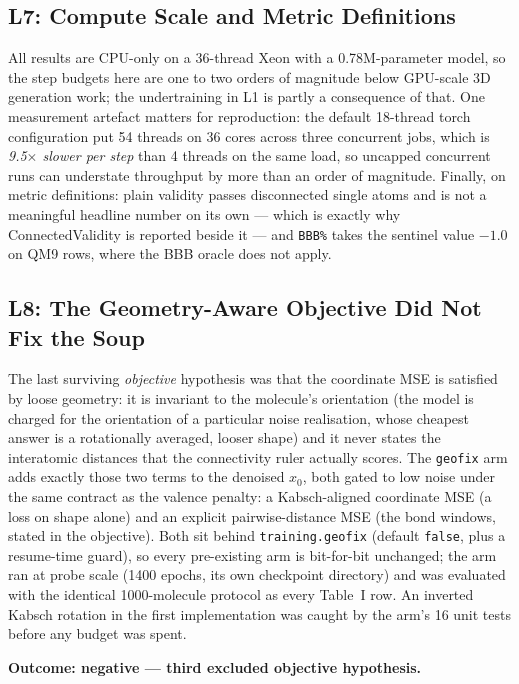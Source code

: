 \documentclass[12pt, a4paper]{article}
\begin{document}
\subsection{L7: Compute Scale and Metric Definitions}

All results are CPU-only on a 36-thread Xeon with a 0.78M-parameter model, so
the step budgets here are one to two orders of magnitude below GPU-scale 3D
generation work; the undertraining in L1 is partly a consequence of that. One
measurement artefact matters for reproduction: the default 18-thread torch
configuration put 54 threads on 36 cores across three concurrent jobs, which is
\emph{9.5$\times$ slower per step} than 4 threads on the same load, so uncapped
concurrent runs can understate throughput by more than an order of magnitude.
Finally, on metric definitions: plain validity passes disconnected single
atoms and is not a meaningful headline number on its own --- which is exactly
why ConnectedValidity is reported beside it --- and \texttt{BBB\%} takes the
sentinel value $-1.0$ on QM9 rows, where the BBB oracle does not apply.

\subsection{L8: The Geometry-Aware Objective Did Not Fix the Soup}

The last surviving \emph{objective} hypothesis was that the coordinate MSE is
satisfied by loose geometry: it is invariant to the molecule's orientation (the
model is charged for the orientation of a particular noise realisation, whose
cheapest answer is a rotationally averaged, looser shape) and it never states
the interatomic distances that the connectivity ruler actually scores. The
\texttt{geofix} arm adds exactly those two terms to the denoised $x_0$, both
gated to low noise under the same contract as the valence penalty: a
Kabsch-aligned coordinate MSE (a loss on shape alone) and an explicit
pairwise-distance MSE (the bond windows, stated in the objective). Both sit
behind \texttt{training.geofix} (default \texttt{false}, plus a resume-time
guard), so every pre-existing arm is bit-for-bit unchanged; the arm ran at
probe scale (1400 epochs, its own checkpoint directory) and was evaluated with
the identical 1000-molecule protocol as every Table~I row. An inverted Kabsch
rotation in the first implementation was caught by the arm's 16 unit tests
before any budget was spent.

\textbf{Outcome: negative --- third excluded objective hypothesis.}
\end{document}

